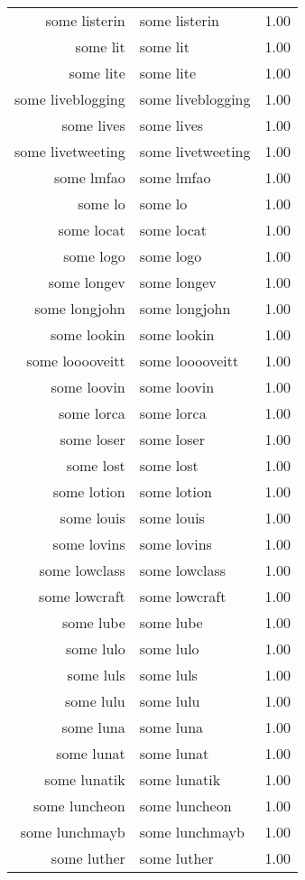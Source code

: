 \begin{table}[ht]
\begin{tabular}{rlr}
  some listerin & some listerin & 1.00 \\ 
  some lit & some lit & 1.00 \\ 
  some lite & some lite & 1.00 \\ 
  some liveblogging & some liveblogging & 1.00 \\ 
  some lives & some lives & 1.00 \\ 
  some livetweeting & some livetweeting & 1.00 \\ 
  some lmfao & some lmfao & 1.00 \\ 
  some lo & some lo & 1.00 \\ 
  some locat & some locat & 1.00 \\ 
  some logo & some logo & 1.00 \\ 
  some longev & some longev & 1.00 \\ 
  some longjohn & some longjohn & 1.00 \\ 
  some lookin & some lookin & 1.00 \\ 
  some looooveitt & some looooveitt & 1.00 \\ 
  some loovin & some loovin & 1.00 \\ 
  some lorca & some lorca & 1.00 \\ 
  some loser & some loser & 1.00 \\ 
  some lost & some lost & 1.00 \\ 
  some lotion & some lotion & 1.00 \\ 
  some louis & some louis & 1.00 \\ 
  some lovins & some lovins & 1.00 \\ 
  some lowclass & some lowclass & 1.00 \\ 
  some lowcraft & some lowcraft & 1.00 \\ 
  some lube & some lube & 1.00 \\ 
  some lulo & some lulo & 1.00 \\ 
  some luls & some luls & 1.00 \\ 
  some lulu & some lulu & 1.00 \\ 
  some luna & some luna & 1.00 \\ 
  some lunat & some lunat & 1.00 \\ 
  some lunatik & some lunatik & 1.00 \\ 
  some luncheon & some luncheon & 1.00 \\ 
  some lunchmayb & some lunchmayb & 1.00 \\ 
  some luther & some luther & 1.00 \\ 

\end{tabular}
\end{table}
